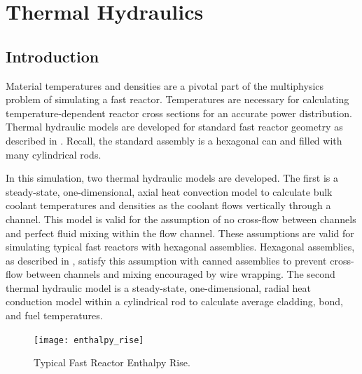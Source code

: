 \chapter{Thermal Hydraulics}
\label{ch:thermalHydraulics}

\section{Introduction}
  Material temperatures and densities are a pivotal part of the multiphysics
  problem of simulating a fast reactor. Temperatures are necessary for
  calculating temperature-dependent reactor cross sections for an accurate power
  distribution.  Thermal hydraulic models are developed for standard fast
  reactor geometry as described in . Recall, the
  standard assembly is a hexagonal can and filled with many cylindrical rods. 

  In this simulation, two thermal hydraulic models are developed. The first is a
  steady-state, one-dimensional, axial heat convection model to calculate bulk
  coolant temperatures and densities as the coolant flows vertically through a
  channel. This model is valid for the assumption of no cross-flow between
  channels and perfect fluid mixing within the flow channel. These assumptions
  are valid for simulating typical fast reactors with hexagonal assemblies.
  Hexagonal assemblies, as described in , satisfy
  this assumption with canned assemblies to prevent cross-flow between channels
  and mixing encouraged by wire wrapping. The second thermal hydraulic model is
  a steady-state, one-dimensional, radial heat conduction model within a
  cylindrical rod to calculate average cladding, bond, and fuel temperatures.

  \begin{figure}
    \centering
    \texttt{[image: enthalpy\_rise]}
    \caption{Typical Fast Reactor Enthalpy Rise.}
    \label{fig:enthalpy_rise}
  \end{figure}

